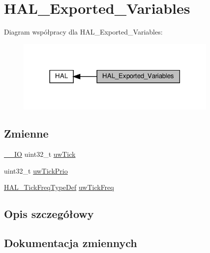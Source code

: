 \hypertarget{group___h_a_l___exported___variables}{}\section{H\+A\+L\+\_\+\+Exported\+\_\+\+Variables}
\label{group___h_a_l___exported___variables}
Diagram współpracy dla H\+A\+L\+\_\+\+Exported\+\_\+\+Variables\+:\nopagebreak
\begin{figure}[H]
\begin{center}
\leavevmode
\includegraphics[width=278pt]{group___h_a_l___exported___variables}
\end{center}
\end{figure}
\subsection*{Zmienne}
\begin{DoxyCompactItemize}
\item 
\hyperlink{core__sc300_8h_aec43007d9998a0a0e01faede4133d6be}{\+\_\+\+\_\+\+IO} uint32\+\_\+t \hyperlink{group___h_a_l___exported___variables_ga9d411ea525781e633bf7ea7ef2f90728}{uw\+Tick}
\item 
uint32\+\_\+t \hyperlink{group___h_a_l___exported___variables_ga3000c5e83924ed2debb1849c738d4be2}{uw\+Tick\+Prio}
\item 
\hyperlink{group___h_a_l___t_i_c_k___f_r_e_q_gab36ec81674817249c46734772ff3b73a}{H\+A\+L\+\_\+\+Tick\+Freq\+Type\+Def} \hyperlink{group___h_a_l___exported___variables_ga84a0c55c4d0bff06a085b4fcfd6531cd}{uw\+Tick\+Freq}
\end{DoxyCompactItemize}


\subsection{Opis szczegółowy}


\subsection{Dokumentacja zmiennych}
\mbox{\label{group___h_a_l___exported___variables_ga9d411ea525781e633bf7ea7ef2f90728}} 
